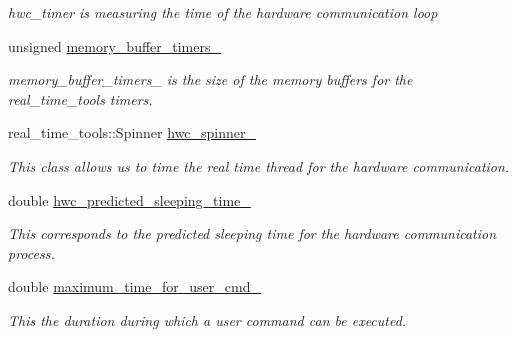 \begin{DoxyCompactItemize}
\begin{DoxyCompactList}\small\item\em hwc\+\_\+timer is measuring the time of the hardware communication loop \end{DoxyCompactList}\item 
\mbox{\label{classdynamic__graph_1_1DynamicGraphManager_a844d4f6c15668884b37111003c8a25a0}} 
unsigned \hyperlink{classdynamic__graph_1_1DynamicGraphManager_a844d4f6c15668884b37111003c8a25a0}{memory\+\_\+buffer\+\_\+timers\+\_\+}
\begin{DoxyCompactList}\small\item\em memory\+\_\+buffer\+\_\+timers\+\_\+ is the size of the memory buffers for the real\+\_\+time\+\_\+tools timers. \end{DoxyCompactList}\item 
\mbox{\label{classdynamic__graph_1_1DynamicGraphManager_ab4716c8ec6194816235e6199863f46f9}} 
real\+\_\+time\+\_\+tools\+::\+Spinner \hyperlink{classdynamic__graph_1_1DynamicGraphManager_ab4716c8ec6194816235e6199863f46f9}{hwc\+\_\+spinner\+\_\+}
\begin{DoxyCompactList}\small\item\em This class allows us to time the real time thread for the hardware communication. \end{DoxyCompactList}\item 
double \hyperlink{classdynamic__graph_1_1DynamicGraphManager_af5aa11023c1dd272d7bbabdcccc511b6}{hwc\+\_\+predicted\+\_\+sleeping\+\_\+time\+\_\+}
\begin{DoxyCompactList}\small\item\em This corresponds to the predicted sleeping time for the hardware communication process. \end{DoxyCompactList}\item 
\mbox{\label{classdynamic__graph_1_1DynamicGraphManager_abb979a3e9235ef71a61579a6a6ad1200}} 
double \hyperlink{classdynamic__graph_1_1DynamicGraphManager_abb979a3e9235ef71a61579a6a6ad1200}{maximum\+\_\+time\+\_\+for\+\_\+user\+\_\+cmd\+\_\+}
\begin{DoxyCompactList}\small\item\em This the duration during which a user command can be executed. \end{DoxyCompactList}\item 

\end{DoxyCompactItemize}
